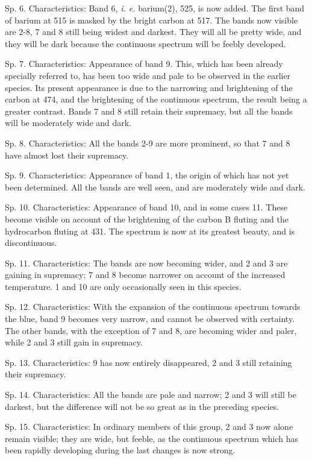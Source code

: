 \documentclass[a4paper, 12pt, oneside, polutonikogreek, english]{article}
\begin{document}
Sp. 6. Characteristics: Band 6, \emph{i. e.} barium(2), 525, is now added. The first band of barium at 515 is masked by the bright carbon at 517. The bands now visible are 2-8, 7 and 8 still being widest and darkest. They will all be pretty wide, and they will be dark because the continuous spectrum will be feebly developed.

Sp. 7. Characteristics: Appearance of band 9. This, which has been already specially referred to, has been too wide and pale to be observed in the earlier species. Its present appearance is due to the narrowing and brightening of the carbon at 474, and the brightening of the continuous spectrum, the result being a greater contrast. Bands 7 and 8 still retain their supremacy, but all the bands will be moderately wide and dark.

Sp. 8. Characteristics: All the bands 2-9 are more prominent, so that 7 and 8 have almost lost their supremacy.

Sp. 9. Characteristics: Appearance of band 1, the origin of which has not yet been determined. All the bands are well seen, and are moderately wide and dark.

Sp. 10. Characteristics: Appearance of band 10, and in some cases 11. These become visible on account of the brightening of the carbon B fluting and the hydrocarbon fluting at 431. The spectrum is now at its greatest beauty, and is discontinuous.

Sp. 11. Characteristics: The bands are now becoming wider, and 2 and 3 are gaining in supremacy; 7 and 8 become narrower on account of the increased temperature. 1 and 10 are only occasionally seen in this species.

Sp. 12. Characteristics: With the expansion of the continuous spectrum towards the blue, band 9 becomes very narrow, and cannot be observed with certainty. The other bands, with the exception of 7 and 8, are becoming wider and paler, while 2 and 3 still gain in supremacy.

Sp. 13. Characteristics: 9 has now entirely disappeared, 2 and 3 still retaining their supremacy.

Sp. 14. Characteristics: All the bands are pale and narrow; 2 and 3 will still be darkest, but the difference will not be so great as in the preceding species.

Sp. 15. Characteristics: In ordinary members of this group, 2 and 3 now alone remain visible; they are wide, but feeble, as the continuous spectrum which has been rapidly developing during the last changes is now strong.
\end{document}
